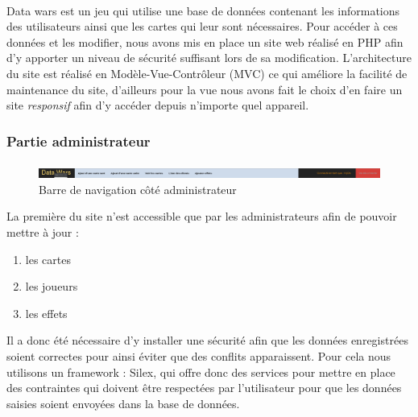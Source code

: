 \documentclass[a4paper,11pt]{report}
\begin{document}
	\paragraph{}
       Data wars est un jeu qui utilise une base de données contenant les informations des utilisateurs ainsi que les cartes qui leur sont nécessaires. Pour accéder à ces données et les modifier, nous avons mis en place un site web réalisé en PHP afin d'y apporter un niveau de sécurité suffisant lors de sa modification. L'architecture du site est réalisé en Modèle-Vue-Contrôleur (MVC) ce qui améliore la facilité de maintenance du site, d’ailleurs pour la vue nous avons fait le choix d'en faire un site \textit{responsif} afin d'y accéder depuis n'importe quel appareil. 

	\subsubsection{Partie administrateur} 
	\paragraph{}

    	\begin{figure}[th]
      	 \begin{center}
          \includegraphics[scale=0.25]{Assets/navbar_admin.png}
          \caption{Barre de navigation côté administrateur}
          \label{RepTravail}
         \end{center}
        \end{figure}

	 La première du site n'est accessible que par les administrateurs afin de pouvoir mettre à jour : 
	\begin{enumerate}
		\item les cartes
		\item les joueurs
		\item les effets
	\end{enumerate}Il a donc été nécessaire d'y installer une sécurité afin que les données enregistrées soient correctes pour ainsi éviter que des conflits apparaissent. Pour cela nous utilisons un framework : Silex, qui offre donc des services pour mettre en place des contraintes qui doivent être respectées par l'utilisateur pour que les données saisies soient envoyées dans la base de données.

	\newpage
\end{document}
